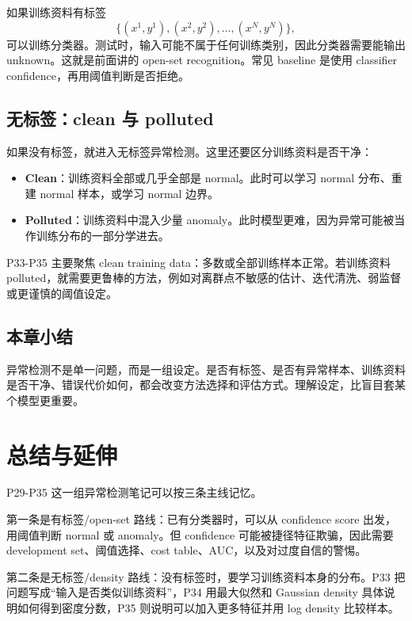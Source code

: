 \documentclass[a4paper]{article}
\begin{document}
如果训练资料有标签
\[
\{(x^1,y^1), (x^2,y^2),\ldots,(x^N,y^N)\},
\]
可以训练分类器。测试时，输入可能不属于任何训练类别，因此分类器需要能输出 unknown。这就是前面讲的 open-set recognition。常见 baseline 是使用 classifier confidence，再用阈值判断是否拒绝。

\subsection{无标签：clean 与 polluted}

如果没有标签，就进入无标签异常检测。这里还要区分训练资料是否干净：
\begin{itemize}
    \item \textbf{Clean}：训练资料全部或几乎全部是 normal。此时可以学习 normal 分布、重建 normal 样本，或学习 normal 边界。
    \item \textbf{Polluted}：训练资料中混入少量 anomaly。此时模型更难，因为异常可能被当作训练分布的一部分学进去。
\end{itemize}

P33-P35 主要聚焦 clean training data：多数或全部训练样本正常。若训练资料 polluted，就需要更鲁棒的方法，例如对离群点不敏感的估计、迭代清洗、弱监督或更谨慎的阈值设定。

\subsection{本章小结}

异常检测不是单一问题，而是一组设定。是否有标签、是否有异常样本、训练资料是否干净、错误代价如何，都会改变方法选择和评估方式。理解设定，比盲目套某个模型更重要。

\section{总结与延伸}

P29-P35 这一组异常检测笔记可以按三条主线记忆。

第一条是有标签/open-set 路线：已有分类器时，可以从 confidence score 出发，用阈值判断 normal 或 anomaly。但 confidence 可能被捷径特征欺骗，因此需要 development set、阈值选择、cost table、AUC，以及对过度自信的警惕。

第二条是无标签/density 路线：没有标签时，要学习训练资料本身的分布。P33 把问题写成“输入是否类似训练资料”，P34 用最大似然和 Gaussian density 具体说明如何得到密度分数，P35 则说明可以加入更多特征并用 log density 比较样本。
\end{document}
